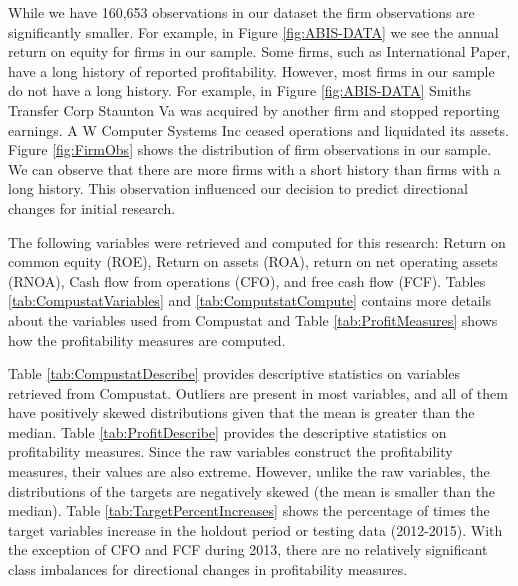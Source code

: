 While we have 160,653 observations in our dataset the firm observations are significantly smaller. For example, in Figure \ref{fig:ABIS-DATA} we see the annual return on equity for firms in our sample. Some firms, such as International Paper, have a long history of reported profitability. However, most firms in our sample do not have a long history. For example, in Figure \ref{fig:ABIS-DATA} Smiths Transfer Corp Staunton Va was acquired by another firm and stopped reporting earnings. A W Computer Systems Inc ceased operations and liquidated its assets. Figure \ref{fig:FirmObs} shows the distribution of firm observations in our sample. We can observe that there are more firms with a short history than firms with a long history. This  observation influenced our decision to predict directional changes for initial research.

The following variables were retrieved and computed for this research: Return on common equity (ROE),  Return on assets (ROA), return on net operating assets (RNOA), Cash flow from operations (CFO),  and free cash flow (FCF).  Tables \ref{tab:CompustatVariables} and \ref{tab:ComputstatCompute} contains more details about the variables used from Compustat and Table \ref{tab:ProfitMeasures} shows how the profitability measures are computed.   




Table \ref{tab:CompustatDescribe} provides descriptive statistics on variables retrieved from Compustat. Outliers are present in most variables, and all of them have positively skewed distributions given that the mean is greater than the median. Table \ref{tab:ProfitDescribe} provides the descriptive statistics on profitability measures.  Since the raw variables construct the profitability measures, their values are also extreme.  However, unlike the raw variables, the distributions of the targets are negatively skewed (the mean is smaller than the median).  Table \ref{tab:TargetPercentIncreases} shows the percentage of times the target variables increase in the holdout period or testing data (2012-2015).   With the exception of CFO and FCF during 2013,  there are no relatively significant class imbalances for directional changes in profitability measures. 

